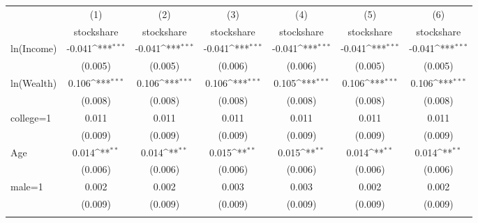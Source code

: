 {
\def\sym#1{\ifmmode^{#1}\else\(^{#1}\)\fi}
\begin{tabular}{l*{6}{c}}
\toprule
                    &\multicolumn{1}{c}{(1)}&\multicolumn{1}{c}{(2)}&\multicolumn{1}{c}{(3)}&\multicolumn{1}{c}{(4)}&\multicolumn{1}{c}{(5)}&\multicolumn{1}{c}{(6)}\\
                    &\multicolumn{1}{c}{stockshare}&\multicolumn{1}{c}{stockshare}&\multicolumn{1}{c}{stockshare}&\multicolumn{1}{c}{stockshare}&\multicolumn{1}{c}{stockshare}&\multicolumn{1}{c}{stockshare}\\
\midrule
ln(Income)          &      -0.041\sym{***}&      -0.041\sym{***}&      -0.041\sym{***}&      -0.041\sym{***}&      -0.041\sym{***}&      -0.041\sym{***}\\
                    &     (0.005)         &     (0.005)         &     (0.006)         &     (0.006)         &     (0.005)         &     (0.005)         \\
\addlinespace
ln(Wealth)          &       0.106\sym{***}&       0.106\sym{***}&       0.106\sym{***}&       0.105\sym{***}&       0.106\sym{***}&       0.106\sym{***}\\
                    &     (0.008)         &     (0.008)         &     (0.008)         &     (0.008)         &     (0.008)         &     (0.008)         \\
\addlinespace
college=1           &       0.011         &       0.011         &       0.011         &       0.011         &       0.011         &       0.011         \\
                    &     (0.009)         &     (0.009)         &     (0.009)         &     (0.009)         &     (0.009)         &     (0.009)         \\
\addlinespace
Age                 &       0.014\sym{**} &       0.014\sym{**} &       0.015\sym{**} &       0.015\sym{**} &       0.014\sym{**} &       0.014\sym{**} \\
                    &     (0.006)         &     (0.006)         &     (0.006)         &     (0.006)         &     (0.006)         &     (0.006)         \\
\addlinespace
male=1              &       0.002         &       0.002         &       0.003         &       0.003         &       0.002         &       0.002         \\
                    &     (0.009)         &     (0.009)         &     (0.009)         &     (0.009)         &     (0.009)         &     (0.009)         \\
\addlinespace

\end{tabular}}
